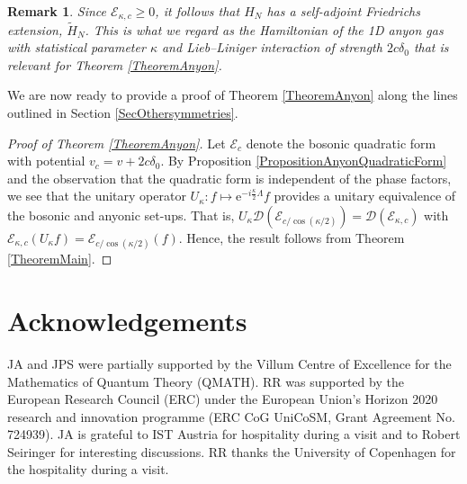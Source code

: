 \documentclass[a4paper,11pt]{article}
\newcommand{\euler}[1]{\text{e}^{#1}}
\newcommand{\dom}[1]{\mathcal D\left(#1\right)}
\newtheorem{remark}[theorem]{Remark}
\numberwithin{equation}{section}
\begin{document}
			\begin{remark}\label{RemarkAnyons}
				Since $ \mathcal{E}_{\kappa,c}\geq0 $, it follows that $ H_N $ has a self-adjoint Friedrichs extension, $ \tilde{H}_N $. This is what we regard as the Hamiltonian of the 1D anyon gas with statistical parameter $ \kappa $ and Lieb--Liniger interaction of strength $2c\delta_0 $ that is relevant for Theorem \ref{TheoremAnyon}.
			\end{remark}

				We are now ready to provide a proof of Theorem \ref{TheoremAnyon} along the lines outlined in Section \ref{SecOthersymmetries}.

			\begin{proof}[Proof of Theorem \ref{TheoremAnyon}]
				Let $ \mathcal{E}_c $ denote the bosonic quadratic form with potential $ v_c=v+2c\delta_0 $. By Proposition \ref{PropositionAnyonQuadraticForm} and the observation that the quadratic form is independent of the phase factors, we see that the unitary operator $ U_\kappa: f\mapsto \euler{-i\frac{\kappa}{2}\Lambda}f $ provides a unitary equivalence of the bosonic and anyonic set-ups. That is, $ U_\kappa\dom{\mathcal{E}_{c/\cos(\kappa/2)}}=\dom{\mathcal{E}_{\kappa,c}} $ with $ \mathcal{E}_{\kappa,c}(U_\kappa f)=\mathcal{E}_{c/\cos(\kappa/2)}(f) $. Hence, the result follows from Theorem \ref{TheoremMain}.
			\end{proof}
			\section{Acknowledgements}
			JA and JPS were partially supported by the Villum Centre of Excellence for the Mathematics of Quantum Theory (QMATH). RR was supported by the European Research Council (ERC) under the European Union’s Horizon 2020 research and innovation programme (ERC CoG UniCoSM, Grant Agreement No. 724939). JA is grateful to IST Austria for hospitality during a visit  and to Robert Seiringer for interesting discussions. RR thanks the University of Copenhagen for the hospitality during a visit.
	
	
	
\end{document}
